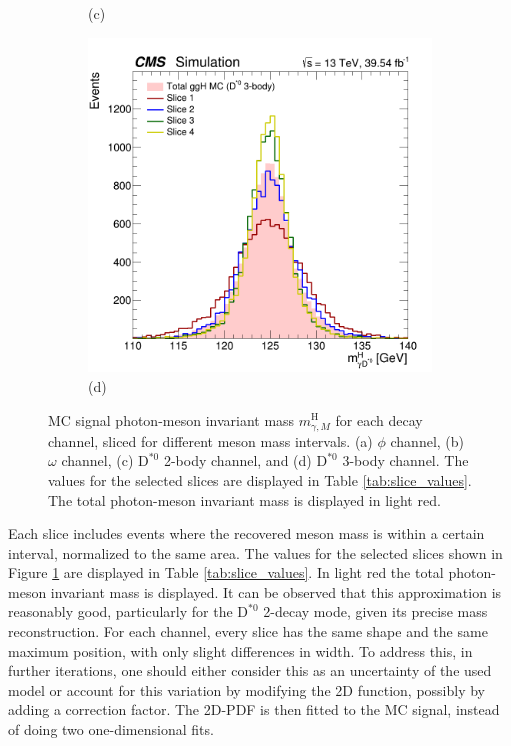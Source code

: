 \begin{figure}[!ht]
\begin{subfigure}[t]{0.50\mylength}
        \vspace*{-0.2cm}
        \caption{\footnotesize (c)}
    \end{subfigure}%
    \begin{subfigure}[t]{0.50\mylength}
        \centering
        \includegraphics[width=0.49\mylength]{resources/plots/D0Star_3body_fit_SGN_MH_sliced.png}
        \vspace*{-0.2cm}
        \caption{\footnotesize (d)}
    \end{subfigure}%
\caption{MC signal photon-meson invariant mass $m^{\text{H}}_{\gamma, M}$ for each decay channel, sliced for different meson mass intervals. (a) $\phi$ channel, (b) $\omega$ channel, (c) $\text{D}^{*0}$ 2-body channel, and (d) $\text{D}^{*0}$ 3-body channel.  The values for the selected slices are displayed in Table \ref{tab:slice_values}. The total photon-meson invariant mass is displayed in light red.}
\label{fig:sig_modelling_sliced}
    \vspace*{-0.0cm}
\end{figure}
Each slice includes events where the recovered meson mass is within a certain interval, normalized to the same area. The values for the selected slices shown in Figure \ref{fig:sig_modelling_sliced} are displayed in Table \ref{tab:slice_values}. In light red the total photon-meson invariant mass is displayed. It can be observed that this approximation is reasonably good, particularly for the $\text{D}^{*0}$ 2-decay mode, given its precise mass reconstruction. For each channel, every slice has the same shape and the same maximum position, with only slight differences in width. To address this, in further iterations, one should either consider this as an uncertainty of the used model or account for this variation by modifying the 2D function, possibly by adding a correction factor. The 2D-PDF is then fitted to the MC signal, instead of doing two one-dimensional fits.
